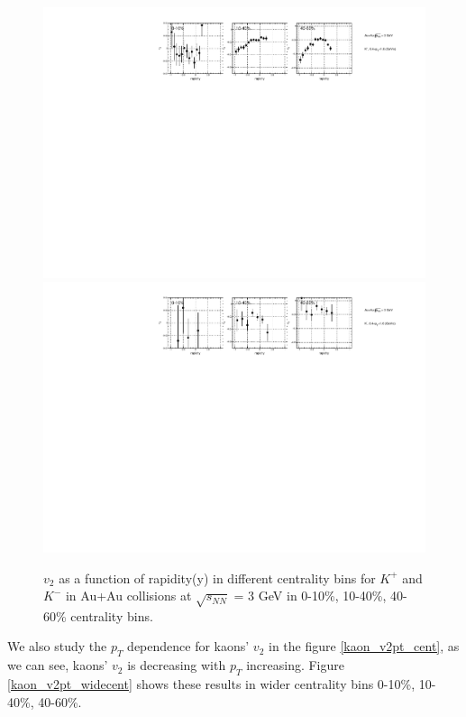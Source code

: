 \begin{figure}[h]
\includegraphics[scale=0.6]{chapter3/fig/v2ypikp/kaonp_v2y_wide_cent.pdf}
\includegraphics[scale=0.6]{chapter3/fig/v2ypikp/kaonm_v2y_wide_cent.pdf}
\caption{$v_{2}$ as a function of rapidity(y) in different centrality bins for $K^{+}$ and $K^{-}$ in Au+Au collisions at $\sqrt{s_{NN}}$ = 3 GeV in 0-10\%, 10-40\%, 40-60\% centrality bins.}
\label{kaon_v2y_widecent}
\end{figure}

We also study the $p_{T}$ dependence for kaons' $v_{2}$ in the figure \ref{kaon_v2pt_cent}, as we can see, kaons' $v_{2}$ is decreasing with $p_{T}$ increasing. Figure \ref{kaon_v2pt_widecent} shows these results in wider centrality bins 0-10\%, 10-40\%, 40-60\%. 


